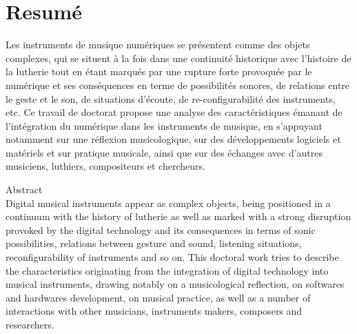 %
\chapter*{Resumé}
\label{sec:abstract}
\vspace*{-10mm}

\noindent Les instruments de musique numériques se présentent comme des objets complexes, qui se situent à la fois dans une continuité historique avec l'histoire de la lutherie tout en étant marqués par une rupture forte provoquée par le numérique et ses conséquences en terme de possibilités sonores, de relations entre le geste et le son, de situations d'écoute, de re-configurabilité des instruments, etc. Ce travail de doctorat propose une analyse des caractéristiques émanant de l'intégration du numérique dans les instruments de musique, en s'appuyant notamment sur une réflexion musicologique, sur des développements logiciels et matériels et sur pratique musicale, ainsi que sur des échanges avec d'autres musiciens, luthiers, compositeurs et chercheurs.

\vspace*{20mm}

{Abstract}\label{sec:abstract-diff} \\

\noindent Digital musical instruments appear as complex objects, being positioned in a continuum with the history of lutherie as well as marked with a strong disruption provoked by the digital technology and its consequences in terms of sonic possibilities, relations between gesture and sound, listening situations, reconfigurability of instruments and so on. This doctoral work tries to describe the characteristics originating from the integration of digital technology into musical instruments, drawing notably on a musicological reflection, on softwares and hardwares development, on musical practice, as well as a number of interactions with other musicians, instruments makers, composers and researchers.
